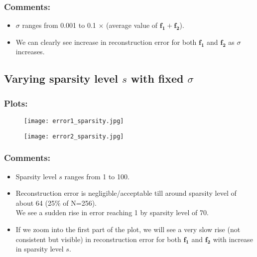 \documentclass[fleqn, 11pt]{article}
\begin{document}
\subsubsection*{Comments:}
\begin{itemize}
    \item $\sigma$ ranges from 0.001 to 0.1 $\times$ (average value of $\boldsymbol{f_1} + \boldsymbol{f_2}$).
    \item We can clearly see increase in reconstruction error for both $\boldsymbol{f_1}$ and $\boldsymbol{f_2}$ as $\sigma$ increases.
\end{itemize}

\subsection*{Varying sparsity level $s$ with fixed $\sigma$}
\subsubsection*{Plots:}
\begin{figure}[H]
    \centering
    \begin{floatrow}
      {\texttt{[image: error1\_sparsity.jpg]}}
      
      {\texttt{[image: error2\_sparsity.jpg]}}
    \end{floatrow}
\end{figure}

\subsubsection*{Comments:}
\begin{itemize}
    \item Sparsity level $s$ ranges from 1 to 100.
    \item Reconstruction error is negligible/acceptable till around sparsity level of about 64 (25\% of N=256). \\
    We see a sudden rise in error reaching 1 by sparsity level of 70.
    \item If we zoom into the first part of the plot, we will see a very slow rise (not consistent but visible) in reconstruction error for both $\boldsymbol{f_1}$ and $\boldsymbol{f_2}$ with increase in sparsity level $s$.
\end{itemize}
\end{document}
